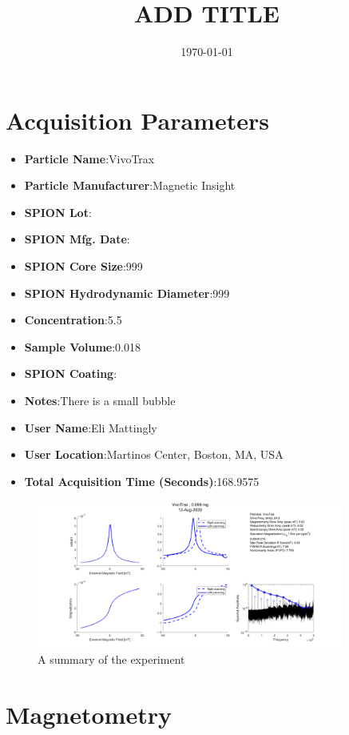 \documentclass{article}
\title{ADD TITLE}
\date{\today}
\begin{document}
\section{Acquisition Parameters}
\begin{itemize}	\item{\textbf{Particle Name}:VivoTrax}
	\item{\textbf{Particle Manufacturer}:Magnetic Insight}
	\item{\textbf{SPION Lot}:}
	\item{\textbf{SPION Mfg. Date}:}
	\item{\textbf{SPION Core Size}:999}
	\item{\textbf{SPION Hydrodynamic Diameter}:999}
	\item{\textbf{Concentration}:5.5}
	\item{\textbf{Sample Volume}:0.018}
	\item{\textbf{SPION Coating}:}
	\item{\textbf{Notes}:There is a small bubble}
	\item{\textbf{User Name}:Eli Mattingly}
	\item{\textbf{User Location}:Martinos Center, Boston, MA, USA}
	\item{\textbf{Total Acquisition Time (Seconds)}:168.9575}
\end{itemize}
\begin{figure}[h] 
 \centering 
 \includegraphics[width=0.9\textwidth]{VivoTrax_12_Aug_2020_CompositeFig.png}
 \caption{A summary of the experiment}
 \end{figure}
\section{Magnetometry}
\end{document}
